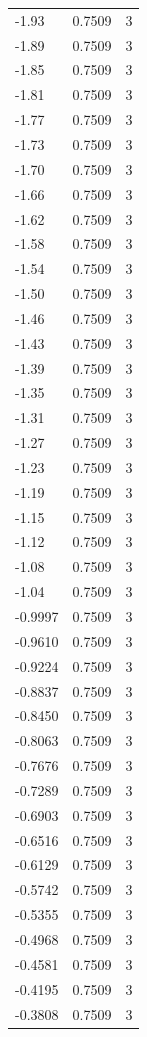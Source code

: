 \begin{longtable}{lrr}
  -1.93 & 0.7509 & 3 \\
  -1.89 & 0.7509 & 3 \\
  -1.85 & 0.7509 & 3 \\
  -1.81 & 0.7509 & 3 \\
  -1.77 & 0.7509 & 3 \\
  -1.73 & 0.7509 & 3 \\
  -1.70 & 0.7509 & 3 \\
  -1.66 & 0.7509 & 3 \\
  -1.62 & 0.7509 & 3 \\
  -1.58 & 0.7509 & 3 \\
  -1.54 & 0.7509 & 3 \\
  -1.50 & 0.7509 & 3 \\
  -1.46 & 0.7509 & 3 \\
  -1.43 & 0.7509 & 3 \\
  -1.39 & 0.7509 & 3 \\
  -1.35 & 0.7509 & 3 \\
  -1.31 & 0.7509 & 3 \\
  -1.27 & 0.7509 & 3 \\
  -1.23 & 0.7509 & 3 \\
  -1.19 & 0.7509 & 3 \\
  -1.15 & 0.7509 & 3 \\
  -1.12 & 0.7509 & 3 \\
  -1.08 & 0.7509 & 3 \\
  -1.04 & 0.7509 & 3 \\
  -0.9997 & 0.7509 & 3 \\
  -0.9610 & 0.7509 & 3 \\
  -0.9224 & 0.7509 & 3 \\
  -0.8837 & 0.7509 & 3 \\
  -0.8450 & 0.7509 & 3 \\
  -0.8063 & 0.7509 & 3 \\
  -0.7676 & 0.7509 & 3 \\
  -0.7289 & 0.7509 & 3 \\
  -0.6903 & 0.7509 & 3 \\
  -0.6516 & 0.7509 & 3 \\
  -0.6129 & 0.7509 & 3 \\
  -0.5742 & 0.7509 & 3 \\
  -0.5355 & 0.7509 & 3 \\
  -0.4968 & 0.7509 & 3 \\
  -0.4581 & 0.7509 & 3 \\
  -0.4195 & 0.7509 & 3 \\
  -0.3808 & 0.7509 & 3 \\

\end{longtable}
